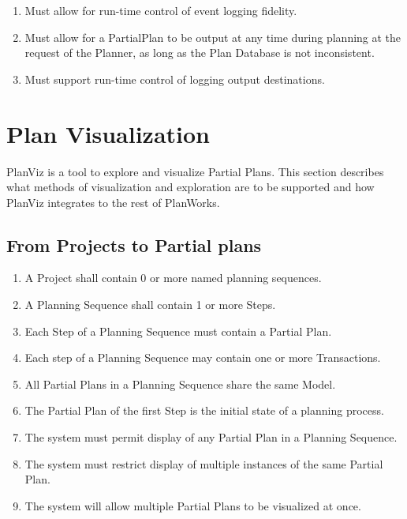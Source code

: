 \documentclass[twoside, 11pt]{article}
\begin{document}
\begin{enumerate}
\item Must allow for run-time control of event logging fidelity.
\item Must allow for a PartialPlan to be output at any time during planning at the request of the Planner, as long as the Plan Database is not inconsistent.
\item Must support run-time control of logging output destinations.
\end{enumerate}

\section{Plan Visualization}
PlanViz is a tool to explore and visualize Partial Plans. This section describes what methods of visualization and exploration are to be supported and how PlanViz integrates to the rest of PlanWorks.
\subsection{From Projects to Partial plans}
\begin{enumerate}
\item A Project shall contain 0 or more named planning sequences.
\item A Planning Sequence shall contain 1 or more Steps.
\item Each Step of a Planning Sequence must contain a Partial Plan.
\item Each step of a Planning Sequence may contain one or more Transactions.
\item All Partial Plans in a Planning Sequence share the same Model.
\item The Partial Plan of the first Step is the initial state of a planning process.
\item The system must permit display of any Partial Plan in a Planning Sequence.
\item The system must restrict display of multiple instances of the same Partial Plan.
\item The system will allow multiple Partial Plans to be visualized at once.
\end{enumerate}
\end{document}
